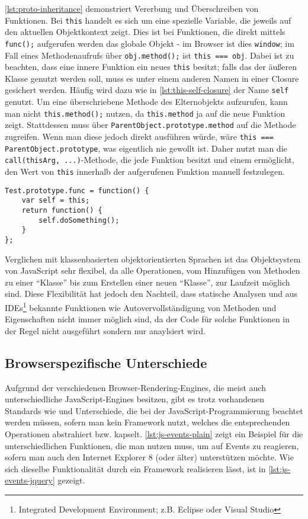 \autoref{lst:proto-inheritance} demonstriert Vererbung und Überschreiben von Funktionen. Bei
\lstinline{this} handelt es sich um eine spezielle Variable, die jeweils auf den aktuellen
Objektkontext zeigt. Dies ist bei Funktionen, die direkt mittels \lstinline{func();} aufgerufen
werden das globale Objekt - im Browser ist dies \lstinline{window}; im Fall eines Methodenaufrufs
über \lstinline{obj.method();} ist \lstinline{this === obj}. Dabei ist zu beachten, dass eine innere
Funktion ein neues \lstinline{this} besitzt; falls das der äußeren Klasse genutzt werden soll, muss
es unter einem anderen Namen in einer Closure gesichert werden. Häufig wird dazu wie in
\autoref{lst:this-self-closure} der Name \lstinline{self} genutzt. Um eine überschriebene Methode
des Elternobjekts aufzurufen, kann man nicht \lstinline{this.method();} nutzen, da
\lstinline{this.method} ja auf die neue Funktion zeigt. Stattdessen muss über
\lstinline{ParentObject.prototype.method} auf die Methode zugreifen. Wenn man diese jedoch direkt
ausführen würde, wäre \lstinline{this === ParentObject.prototype}, was eigentlich nie gewollt ist.
Daher nutzt man die \lstinline{call(thisArg, ...)}-Methode, die jede Funktion besitzt und einem
ermöglicht, den Wert von \lstinline{this} innerhalb der aufgerufenen Funktion manuell festzulegen.

\begin{lstlisting}[label=lst:this-self-closure,caption=Sichern von this mittels einer Closure]
Test.prototype.func = function() {
    var self = this;
    return function() {
        self.doSomething();
    }
};
\end{lstlisting}

Verglichen mit klassenbasierten objektorientierten Sprachen ist das Objektsystem von JavaScript sehr
flexibel, da alle Operationen, vom Hinzufügen von Methoden zu einer \enquote{Klasse} bis zum Erstellen einer
neuen \enquote{Klasse}, zur Laufzeit möglich sind. Diese Flexibilität hat jedoch den Nachteil, dass
statische Analysen und aus IDEs\footnote{Integrated Development Environment; z.B. Eclipse oder
Visual Studio} bekannte Funktionen wie Autovervollständigung von Methoden und Eigenschaften nicht
immer möglich sind, da der Code für solche Funktionen in der Regel nicht ausgeführt sondern nur
anaylsiert wird.

\subsection{Browserspezifische Unterschiede}\label{js-events}
Aufgrund der verschiedenen Browser-Rendering-Engines, die meist auch unterschiedliche
JavaScript-Engines besitzen, gibt es trotz vorhandenen Standards wie \citep{ecmascript} und
\citep{w3c:dom} Unterschiede, die bei der JavaScript-Programmierung beachtet werden müssen, sofern
man kein Framework nutzt, welches die entsprechenden Operationen abstrahiert bzw. kapselt.
\autoref{lst:js-events-plain} zeigt ein Beispiel für die unterschiedlichen Funktionen, die man nutzen
muss, um auf Events zu reagieren, sofern man auch den Internet Explorer 8 (oder älter) unterstützen
möchte. Wie sich dieselbe Funktionalität durch ein Framework realisieren lässt, ist in
\autoref{lst:js-events-jquery} gezeigt.

